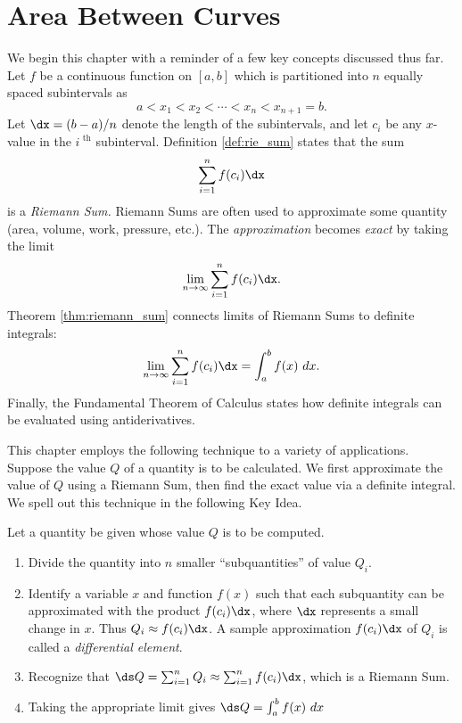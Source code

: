 \section{Area Between Curves}\label{sec:AreaBetweenCurves}



We begin this chapter with a reminder of a few key concepts discussed thus far. Let $f$ be a continuous function on $[a,b]$ which is partitioned into $n$ equally spaced subintervals as $$a<x_1 < x_2 < \cdots < x_n<x_{n+1}=b.$$ Let $\dx=(b-a)/n$ denote the length of the  subintervals, and let $c_i$ be any $x$-value in the $i^\text{ th}$ subinterval. Definition \ref{def:rie_sum} states that the sum $$\sum_{i=1}^n f(c_i)\dx$$ is a \textit{Riemann Sum.} Riemann Sums are often used to approximate some quantity (area, volume, work, pressure, etc.). The \textit{approximation} becomes \textit{exact} by taking the limit 
$$\lim_{n\to\infty} \sum_{i=1}^n f(c_i)\dx.$$ Theorem \ref{thm:riemann_sum} connects limits of Riemann Sums to definite integrals:
$$\lim_{n\to\infty} \sum_{i=1}^n f(c_i)\dx = \int_a^b f(x)\ dx.$$ Finally, the Fundamental Theorem of Calculus states how definite integrals can be evaluated using antiderivatives. 

This chapter employs the following technique to a variety of applications. Suppose the value $Q$ of a quantity is to be calculated. We first approximate the value of $Q$ using a Riemann Sum, then find the exact value via a definite integral. We spell out this technique in the following Key Idea.


\begin{formulabox}
{Let a quantity be given whose value $Q$ is to be computed.
\begin{enumerate}
\item		Divide the quantity into $n$ smaller ``subquantities'' of value $Q_i$.
\item		Identify a variable $x$ and function $f(x)$ such that each subquantity can be approximated with the product $f(c_i)\dx$, where $\dx$ represents a small change in $x$. Thus $Q_i \approx f(c_i)\dx$. A sample approximation $f(c_i)\dx$ of $Q_i$ is called a \textit{differential element}.
\item		Recognize that $\ds Q= \sum_{i=1}^n Q_i \approx \sum_{i=1}^n f(c_i)\dx$, which is a Riemann Sum.
\item		Taking the appropriate limit gives $\ds Q = \int_a^b f(x)\ dx$
\end{enumerate}
}
\end{formulabox}


